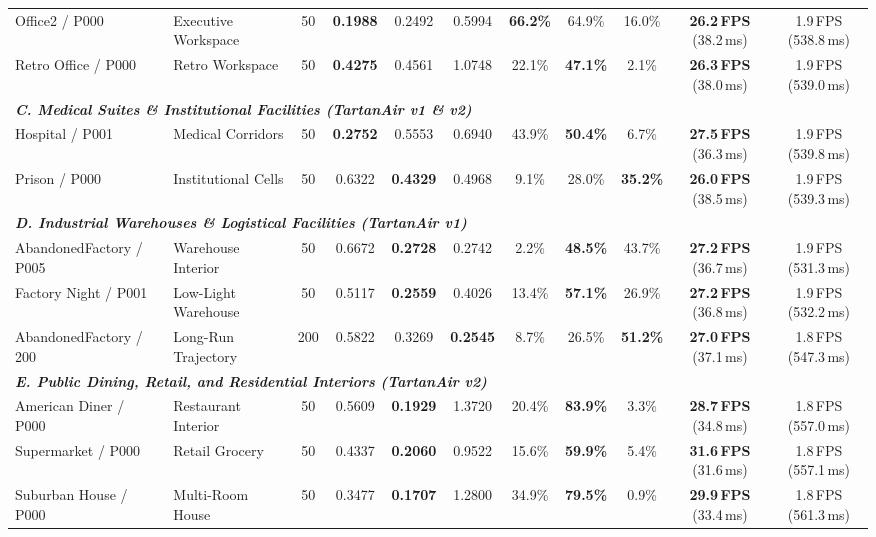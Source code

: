 \begin{table}[t]
{\begin{tabular}{ll c | ccc ccc | cc}
Office2 / P000 & Executive Workspace & 50 & \textbf{0.1988} & 0.2492 & 0.5994 & \textbf{66.2\%} & 64.9\% & 16.0\% & \textbf{26.2\,FPS} (38.2\,ms) & 1.9\,FPS (538.8\,ms) \\
Retro Office / P000 & Retro Workspace & 50 & \textbf{0.4275} & 0.4561 & 1.0748 & 22.1\% & \textbf{47.1\%} & 2.1\% & \textbf{26.3\,FPS} (38.0\,ms) & 1.9\,FPS (539.0\,ms) \\
\midrule
\multicolumn{11}{l}{\textit{\textbf{C. Medical Suites \& Institutional Facilities (TartanAir v1 \& v2)}}} \\
Hospital / P001 & Medical Corridors & 50 & \textbf{0.2752} & 0.5553 & 0.6940 & 43.9\% & \textbf{50.4\%} & 6.7\% & \textbf{27.5\,FPS} (36.3\,ms) & 1.9\,FPS (539.8\,ms) \\
Prison / P000 & Institutional Cells & 50 & 0.6322 & \textbf{0.4329} & 0.4968 & 9.1\% & 28.0\% & \textbf{35.2\%} & \textbf{26.0\,FPS} (38.5\,ms) & 1.9\,FPS (539.3\,ms) \\
\midrule
\multicolumn{11}{l}{\textit{\textbf{D. Industrial Warehouses \& Logistical Facilities (TartanAir v1)}}} \\
AbandonedFactory / P005 & Warehouse Interior & 50 & 0.6672 & \textbf{0.2728} & 0.2742 & 2.2\% & \textbf{48.5\%} & 43.7\% & \textbf{27.2\,FPS} (36.7\,ms) & 1.9\,FPS (531.3\,ms) \\
Factory Night / P001 & Low-Light Warehouse & 50 & 0.5117 & \textbf{0.2559} & 0.4026 & 13.4\% & \textbf{57.1\%} & 26.9\% & \textbf{27.2\,FPS} (36.8\,ms) & 1.9\,FPS (532.2\,ms) \\
AbandonedFactory / 200 & Long-Run Trajectory & 200 & 0.5822 & 0.3269 & \textbf{0.2545} & 8.7\% & 26.5\% & \textbf{51.2\%} & \textbf{27.0\,FPS} (37.1\,ms) & 1.8\,FPS (547.3\,ms) \\
\midrule
\multicolumn{11}{l}{\textit{\textbf{E. Public Dining, Retail, and Residential Interiors (TartanAir v2)}}} \\
American Diner / P000 & Restaurant Interior & 50 & 0.5609 & \textbf{0.1929} & 1.3720 & 20.4\% & \textbf{83.9\%} & 3.3\% & \textbf{28.7\,FPS} (34.8\,ms) & 1.8\,FPS (557.0\,ms) \\
Supermarket / P000 & Retail Grocery & 50 & 0.4337 & \textbf{0.2060} & 0.9522 & 15.6\% & \textbf{59.9\%} & 5.4\% & \textbf{31.6\,FPS} (31.6\,ms) & 1.8\,FPS (557.1\,ms) \\
Suburban House / P000 & Multi-Room House & 50 & 0.3477 & \textbf{0.1707} & 1.2800 & 34.9\% & \textbf{79.5\%} & 0.9\% & \textbf{29.9\,FPS} (33.4\,ms) & 1.8\,FPS (561.3\,ms) \\

\end{tabular}}
\end{table}
